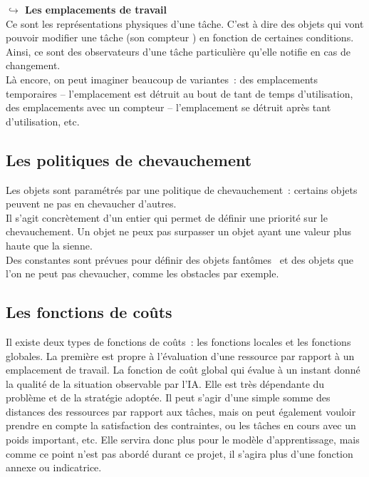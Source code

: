 \textbf{$\hookrightarrow$ Les emplacements de travail}\\

Ce sont les représentations physiques d'une tâche. C'est à dire des objets qui vont pouvoir modifier une tâche (son \og compteur \fg ) en fonction de certaines conditions.\\
\indent Ainsi, ce sont des observateurs d'une tâche particulière qu'elle notifie en cas de changement.\\

Là encore, on peut imaginer beaucoup de variantes~: des emplacements temporaires – l'emplacement est détruit au bout de tant de temps d'utilisation, des emplacements avec un compteur – l'emplacement se détruit après tant d'utilisation, etc.

\subsection{Les politiques de chevauchement}

Les objets sont paramétrés par une politique de chevauchement~: certains objets peuvent ne pas en chevaucher d'autres.\\
\indent Il s'agit concrètement d'un entier qui permet de définir une priorité sur le chevauchement. Un objet ne peux pas surpasser un objet ayant une valeur plus haute que la sienne.\\
\indent Des constantes sont prévues pour définir des objets \og fantômes \fg ~et des objets que l'on ne peut pas chevaucher, comme les obstacles par exemple.

\subsection{Les fonctions de coûts}

Il existe deux types de fonctions de coûts~: les fonctions locales et les fonctions globales. La première est propre à l'évaluation d'une ressource par rapport à un emplacement de travail.
La fonction de coût global qui évalue à un instant donné la qualité de la situation observable par l'IA. Elle est très dépendante du problème et de la stratégie adoptée. Il peut s'agir d'une simple somme des distances des ressources par rapport aux tâches, mais on peut également vouloir prendre en compte la satisfaction des contraintes, ou les tâches en cours avec un poids important, etc.
Elle servira donc plus pour le modèle d'apprentissage, mais comme ce point n'est pas abordé durant ce projet, il s'agira plus d'une fonction annexe ou indicatrice.\\

